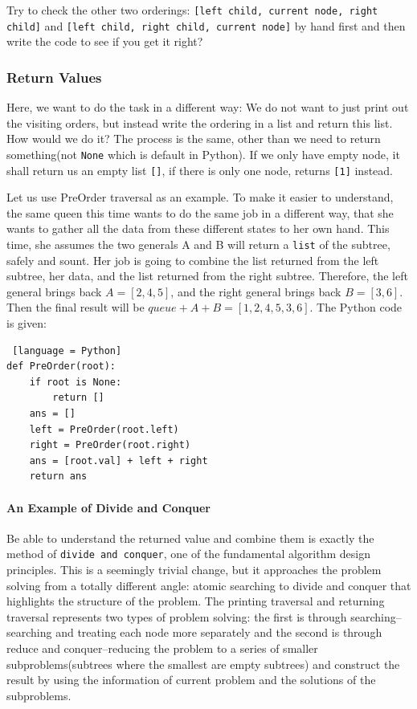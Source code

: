 \documentclass[main.tex]{subfiles}
\begin{document}
\begin{bclogo}[couleur = blue!30, arrondi=0.1,logo=\bccrayon,ombre=true]{Try to check  the other two orderings: \texttt{[left child, current node, right child]} and \texttt{[left child, right child, current node]} by hand first and then write the code to see if you get it right?} 
\end{bclogo}



\subsubsection{Return Values} 
Here, we want to do the task in a different way: We do not want to just print out the visiting orders, but instead write the ordering in a list and return this list. How would we do it? The process is the same, other than  we need to return something(not \texttt{None} which is default in Python). If we only have empty node, it shall return us an empty list \texttt{[]}, if there is only one node, returns \texttt{[1]} instead. 

Let us use PreOrder traversal as an example. To make it easier to understand, the same queen this time wants to do the same job in a different way, that she wants to gather all the data from these different states to her own hand. This time, she assumes the two generals A and B will return a \texttt{list} of the subtree, safely and sount. Her job is going to combine the list returned from the left subtree, her data, and the list returned from the right subtree. Therefore, the left general brings back $A=[2,4,5]$, and the right general brings back $B=[3, 6]$. Then the final result will be $queue + A + B = [1,2,4,5,3, 6]$. The Python code is given:
\begin{lstlisting} [language = Python]
def PreOrder(root):
    if root is None:
        return []
    ans = []
    left = PreOrder(root.left)
    right = PreOrder(root.right)
    ans = [root.val] + left + right
    return ans
\end{lstlisting}
\paragraph{An Example of Divide and Conquer} Be able to understand the returned value and combine them is exactly the method of \texttt{divide and conquer}, one of the fundamental algorithm design principles. This is a seemingly trivial change, but it approaches the problem solving from a totally different angle: atomic searching to divide and conquer that highlights the structure of the problem. The printing traversal and returning traversal represents two types of problem solving: the first is through searching--searching and treating each node more separately and the second is through reduce and conquer--reducing the problem to a series of smaller subproblems(subtrees where the smallest are empty subtrees) and construct the result by using the information of current problem and the solutions of the subproblems. 
\end{document}

